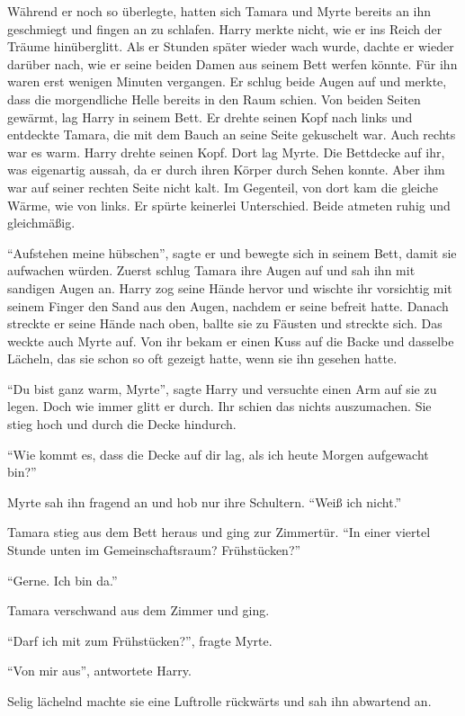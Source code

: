 Während er noch so überlegte, hatten sich Tamara und Myrte bereits an ihn geschmiegt und fingen an zu schlafen. Harry merkte nicht, wie er ins Reich der Träume hinüberglitt. Als er Stunden später wieder wach wurde, dachte er wieder darüber nach, wie er seine beiden Damen aus seinem Bett werfen könnte. Für ihn waren erst wenigen Minuten vergangen. Er schlug beide Augen auf und merkte, dass die morgendliche Helle bereits in den Raum schien. Von beiden Seiten gewärmt, lag Harry in seinem Bett. Er drehte seinen Kopf nach links und entdeckte Tamara, die mit dem Bauch an seine Seite gekuschelt war. Auch rechts war es warm. Harry drehte seinen Kopf. Dort lag Myrte. Die Bettdecke auf ihr, was eigenartig aussah, da er durch ihren Körper durch Sehen konnte. Aber ihm war auf seiner rechten Seite nicht kalt. Im Gegenteil, von dort kam die gleiche Wärme, wie von links. Er spürte keinerlei Unterschied. Beide atmeten ruhig und gleichmäßig.

\enquote{Aufstehen meine hübschen}, sagte er und bewegte sich in seinem Bett, damit sie aufwachen würden. Zuerst schlug Tamara ihre Augen auf und sah ihn mit sandigen Augen an. Harry zog seine Hände hervor und wischte ihr vorsichtig mit seinem Finger den Sand aus den Augen, nachdem er seine befreit hatte. Danach streckte er seine Hände nach oben, ballte sie zu Fäusten und streckte sich. Das weckte auch Myrte auf. Von ihr bekam er einen Kuss auf die Backe und dasselbe  Lächeln, das sie schon so oft gezeigt hatte, wenn sie ihn gesehen hatte.

\enquote{Du bist ganz warm, Myrte}, sagte Harry und versuchte einen Arm auf sie zu legen. Doch wie immer glitt er durch. Ihr schien das nichts auszumachen. Sie stieg hoch und durch die Decke hindurch.

\enquote{Wie kommt es, dass die Decke auf dir lag, als ich heute Morgen aufgewacht bin?}

Myrte sah ihn fragend an und hob nur ihre Schultern. \enquote{Weiß ich nicht.}

Tamara stieg aus dem Bett heraus und ging zur Zimmertür. \enquote{In einer viertel Stunde unten im Gemeinschaftsraum? Frühstücken?}

\enquote{Gerne. Ich bin da.}

Tamara verschwand aus dem Zimmer und ging.

\enquote{Darf ich mit zum Frühstücken?}, fragte Myrte.

\enquote{Von mir aus}, antwortete Harry.

Selig lächelnd machte sie eine Luftrolle rückwärts und sah ihn abwartend an.

